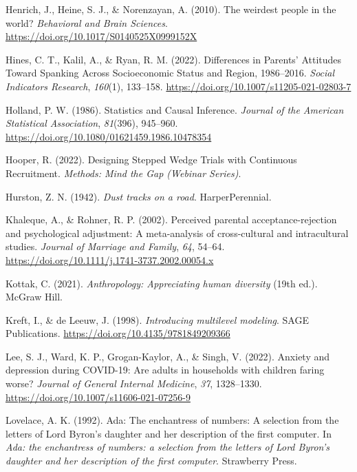 \documentclass[
  letterpaper,
  DIV=11,
  numbers=noendperiod]{scrreprt}
\newlength{\cslhangindent}
\newenvironment{CSLReferences}[2] %
 {\begin{list}{}{%
  \setlength{\itemindent}{0pt}
  \setlength{\leftmargin}{0pt}
  \setlength{\parsep}{0pt}
  \ifodd #1
   \setlength{\leftmargin}{\cslhangindent}
   \setlength{\itemindent}{-1\cslhangindent}
  \fi
  \setlength{\itemsep}{#2\baselineskip}}}
 {\end{list}}
\begin{document}
\begin{CSLReferences}{1}{0}
Henrich, J., Heine, S. J., \& Norenzayan, A. (2010). {The weirdest
people in the world?} \emph{Behavioral and Brain Sciences}.
\url{https://doi.org/10.1017/S0140525X0999152X}

Hines, C. T., Kalil, A., \& Ryan, R. M. (2022). {Differences in Parents'
Attitudes Toward Spanking Across Socioeconomic Status and Region,
1986--2016}. \emph{Social Indicators Research}, \emph{160}(1), 133--158.
\url{https://doi.org/10.1007/s11205-021-02803-7}

Holland, P. W. (1986). {Statistics and Causal Inference}. \emph{Journal
of the American Statistical Association}, \emph{81}(396), 945--960.
\url{https://doi.org/10.1080/01621459.1986.10478354}

Hooper, R. (2022). {Designing Stepped Wedge Trials with Continuous
Recruitment}. \emph{Methods: Mind the Gap (Webinar Series)}.

Hurston, Z. N. (1942). \emph{Dust tracks on a road}. HarperPerennial.

Khaleque, A., \& Rohner, R. P. (2002). Perceived parental
acceptance-rejection and psychological adjustment: A meta-analysis of
cross-cultural and intracultural studies. \emph{Journal of Marriage and
Family}, \emph{64}, 54--64.
\url{https://doi.org/10.1111/j.1741-3737.2002.00054.x}

Kottak, C. (2021). \emph{Anthropology: Appreciating human diversity}
(19th ed.). McGraw Hill.

Kreft, I., \& de Leeuw, J. (1998). \emph{Introducing multilevel
modeling}. SAGE Publications.
\url{https://doi.org/10.4135/9781849209366}

Lee, S. J., Ward, K. P., Grogan-Kaylor, A., \& Singh, V. (2022). Anxiety
and depression during {COVID-19}: Are adults in households with children
faring worse? \emph{Journal of General Internal Medicine}, \emph{37},
1328--1330. \url{https://doi.org/10.1007/s11606-021-07256-9}

Lovelace, A. K. (1992). Ada: The enchantress of numbers: A selection
from the letters of {L}ord {B}yron's daughter and her description of the
first computer. In \emph{Ada: the enchantress of numbers: a selection
from the letters of {L}ord {B}yron's daughter and her description of the
first computer}. Strawberry Press.


\end{CSLReferences}
\end{document}
